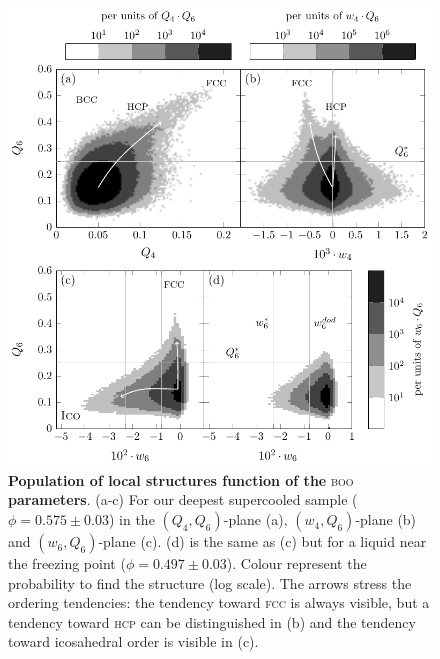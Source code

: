 \begin{figure}
\begin{center}
\includegraphics{generate_figures-figure1.pdf}
\end{center}
\caption{\textbf{Population of local structures function of the }\textsc{boo}\textbf{ parameters}. (a-c) For our deepest supercooled sample ($\phi=0.575\pm 0.03$) in the $(Q_4,Q_6)$-plane (a), $(w_4,Q_6)$-plane (b) and $(w_6,Q_6)$-plane (c). (d) is the same as (c) but for a liquid near the freezing point ($\phi = 0.497 \pm 0.03$). Colour represent the probability to find the structure (log scale). The arrows stress the ordering tendencies: the tendency toward \textsc{fcc} is always visible, but a tendency toward \textsc{hcp} can be distinguished in (b) and the tendency toward icosahedral order is visible in (c).}
	\label{fig:maps}
\end{figure}

\clearpage

